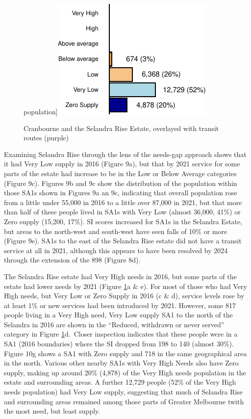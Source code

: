 \documentclass[preprint, 3p,
authoryear]{elsarticle} %
\begin{document}
\begin{figure}
population\label{fig:Selandra_rise_2021-8}]{\includegraphics{ReynoldsCurrieQu2024_files/figure-latex/Selandra_rise_2021-8} }\newline\hfill{}

\caption{Cranbourne and the Selandra Rise Estate, overlayed with transit routes (purple)}\label{fig:Selandra_rise_2021}
\end{figure}

Examining Selandra Rise through the lens of the needs-gap approach shows
that it had Very Low supply in 2016 (Figure 9a), but that by 2021
service for some parts of the estate had increase to be in the Low or
Below Average categories (Figure 9c). Figures 9b and 9c show the
distribution of the population within those SA1s shown in Figures 9a an
9c, indicating that overall population rose from a little under 55,000
in 2016 to a little over 87,000 in 2021, but that more than half of
these people lived in SA1s with Very Low (almost 36,000, 41\%) or Zero
supply (15,200, 17\%). SI scores increased for SA1s in the Selandra
Estate, but areas to the north-west and south-west have seen falls of
10\% or more (Figure 9e). SA1s to the east of the Selandra Rise estate
did not have a transit service at all in 2021, although this appears to
have been resolved by 2024 through the extension of the 898 (Figure 8d).

The Selandra Rise estate had Very High needs in 2016, but some parts of
the estate had lower needs by 2021 (Figure \ref{fig:Selandra_rise_2021}a
\& e). For most of those who had Very High needs, but Very Low or Zero
Supply in 2016 (c \& d), service levels rose by at least 1\% or new
services had been introduced by 2021. However, some 817 people living in
a Very High need, Very Low supply SA1 to the north of the Selandra in
2016 are shown in the ``Reduced, withdrawn or never served'' category in
Figure \ref{fig:Selandra_rise_2021}d.~Closer inspection indicates that
these people were in a SA1 (2016 boundaries) where the SI dropped from
198 to 140 (almost 30\%). Figure 10g shows a SA1 with Zero supply and
718 in the same geographical area in the north. Various other nearby
SA1s with Very High Needs also have Zero supply, making up around 20\%
(4,878) of the Very High needs population in the estate and surrounding
areas. A further 12,729 people (52\% of the Very High needs population)
had Very Low supply, suggesting that much of Selandra Rise and
surrounding areas remained among those parts of Greater Melbourne twith
the most need, but least supply.
\end{document}
